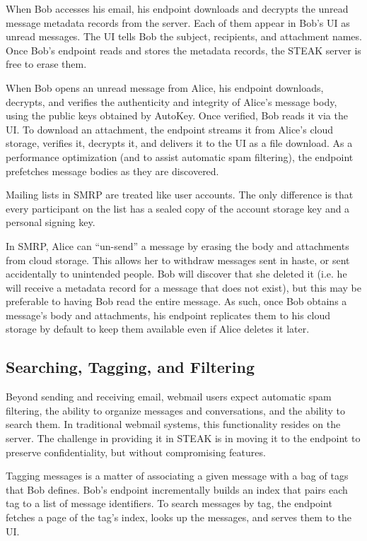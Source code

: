 When Bob accesses his email, his endpoint downloads and decrypts the unread message metadata records from the server.  Each of them appear in Bob's UI as unread messages. The UI tells Bob the subject, recipients, and attachment names.  Once Bob's endpoint reads and stores the metadata records, the STEAK server is free to erase them.  

When Bob opens an unread message from Alice, his endpoint downloads, decrypts, and verifies the authenticity and integrity of Alice's message body, using the public keys obtained by AutoKey. Once verified, Bob reads it via the UI. To download an attachment, the endpoint streams it from Alice's cloud storage, verifies it, decrypts it, and delivers it to the UI as a file download.  As a performance optimization (and to assist automatic spam filtering), the endpoint prefetches message bodies as they are discovered.

Mailing lists in SMRP are treated like user accounts.  The only difference is that every participant on the list has a sealed copy of the account storage key and a personal signing key.

In SMRP, Alice can ``un-send'' a message by erasing the body and attachments from cloud storage.  This allows her to withdraw messages sent in haste, or sent accidentally to unintended people.  Bob will discover that she deleted it (i.e. he will receive a metadata record for a message that does not exist), but this may be preferable to having Bob read the entire message.  As such, once Bob obtains a message’s body and attachments, his endpoint replicates them to his cloud storage by default to keep them available even if Alice deletes it later.

\subsection{Searching, Tagging, and Filtering}
Beyond sending and receiving email, webmail users expect automatic spam filtering, the ability to organize messages and conversations, and the ability to search them.  In traditional webmail systems, this functionality resides on the server.  The challenge in providing it in STEAK is in moving it to the endpoint to preserve confidentiality, but without compromising features.

Tagging messages is a matter of associating a given message with a bag of tags that Bob defines.  Bob’s endpoint incrementally builds an index that pairs each tag to a list of message identifiers.  To search messages by tag, the endpoint fetches a page of the tag’s index, looks up the messages, and serves them to the UI.

